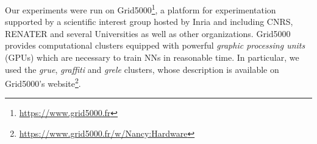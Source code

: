 Our experiments were run on Grid5000\footnote{\url{https://www.grid5000.fr}}, a platform for experimentation supported by a scientific interest group hosted by Inria and including CNRS, RENATER and several Universities as well as other organizations.
Grid5000 provides computational clusters equipped with powerful \textit{graphic processing units} (GPUs) which are necessary to train NNs in reasonable time.
In particular, we used the \textit{grue}, \textit{graffiti} and \textit{grele} clusters, whose description is available on Grid5000's website\footnote{\url{https://www.grid5000.fr/w/Nancy:Hardware}}.